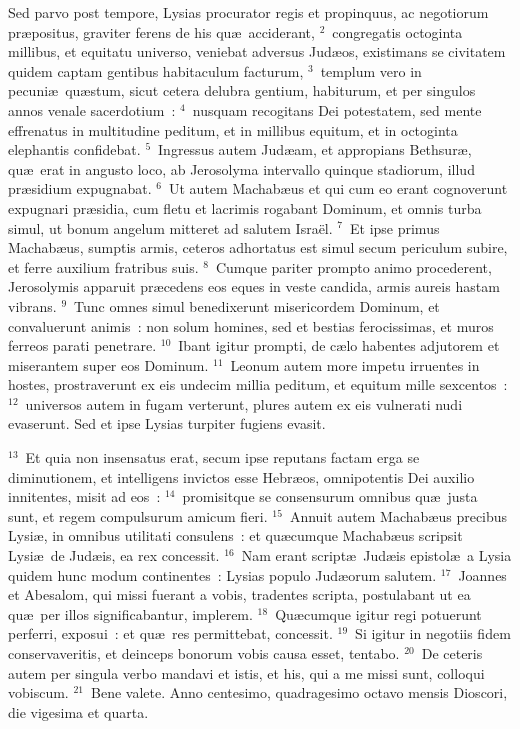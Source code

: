 \bchapter
\lettrine[lines=3,image=true,loversize=0.05,lraise=-0.03]{S}{}ed parvo post tempore, Lysias procurator regis et propinquus, ac negotiorum pr\ae positus, graviter ferens de his qu\ae\ acciderant,
${}^{2}$~congregatis octoginta millibus, et equitatu universo, veniebat adversus Jud\ae os, existimans se civitatem quidem captam gentibus habitaculum facturum,
${}^{3}$~templum vero in pecuni\ae\ qu\ae stum, sicut cetera delubra gentium, habiturum, et per singulos annos venale sacerdotium~:
${}^{4}$~nusquam recogitans Dei potestatem, sed mente effrenatus in multitudine peditum, et in millibus equitum, et in octoginta elephantis confidebat.
${}^{5}$~Ingressus autem Jud\ae am, et appropians Bethsur\ae , qu\ae\ erat in angusto loco, ab Jerosolyma intervallo quinque stadiorum, illud pr\ae sidium expugnabat.
${}^{6}$~Ut autem Machab\ae us et qui cum eo erant cognoverunt expugnari pr\ae sidia, cum fletu et lacrimis rogabant Dominum, et omnis turba simul, ut bonum angelum mitteret ad salutem Isra\"el.
${}^{7}$~Et ipse primus Machab\ae us, sumptis armis, ceteros adhortatus est simul secum periculum subire, et ferre auxilium fratribus suis.
${}^{8}$~Cumque pariter prompto animo procederent, Jerosolymis apparuit pr\ae cedens eos eques in veste candida, armis aureis hastam vibrans.
${}^{9}$~Tunc omnes simul benedixerunt misericordem Dominum, et convaluerunt animis~: non solum homines, sed et bestias ferocissimas, et muros ferreos parati penetrare.
${}^{10}$~Ibant igitur prompti, de c\ae lo habentes adjutorem et miserantem super eos Dominum.
${}^{11}$~Leonum autem more impetu irruentes in hostes, prostraverunt ex eis undecim millia peditum, et equitum mille sexcentos~:
${}^{12}$~universos autem in fugam verterunt, plures autem ex eis vulnerati nudi evaserunt. Sed et ipse Lysias turpiter fugiens evasit.


${}^{13}$~Et quia non insensatus erat, secum ipse reputans factam erga se diminutionem, et intelligens invictos esse Hebr\ae os, omnipotentis Dei auxilio innitentes, misit ad eos~:
${}^{14}$~promisitque se consensurum omnibus qu\ae\ justa sunt, et regem compulsurum amicum fieri.
${}^{15}$~Annuit autem Machab\ae us precibus Lysi\ae , in omnibus utilitati consulens~: et qu\ae cumque Machab\ae us scripsit Lysi\ae\ de Jud\ae is, ea rex concessit.
${}^{16}$~Nam erant script\ae\ Jud\ae is epistol\ae\ a Lysia quidem hunc modum continentes~: Lysias populo Jud\ae orum salutem.
${}^{17}$~Joannes et Abesalom, qui missi fuerant a vobis, tradentes scripta, postulabant ut ea qu\ae\ per illos significabantur, implerem.
${}^{18}$~Qu\ae cumque igitur regi potuerunt perferri, exposui~: et qu\ae\ res permittebat, concessit.
${}^{19}$~Si igitur in negotiis fidem conservaveritis, et deinceps bonorum vobis causa esset, tentabo.
${}^{20}$~De ceteris autem per singula verbo mandavi et istis, et his, qui a me missi sunt, colloqui vobiscum.
${}^{21}$~Bene valete. Anno centesimo, quadragesimo octavo mensis Dioscori, die vigesima et quarta.


